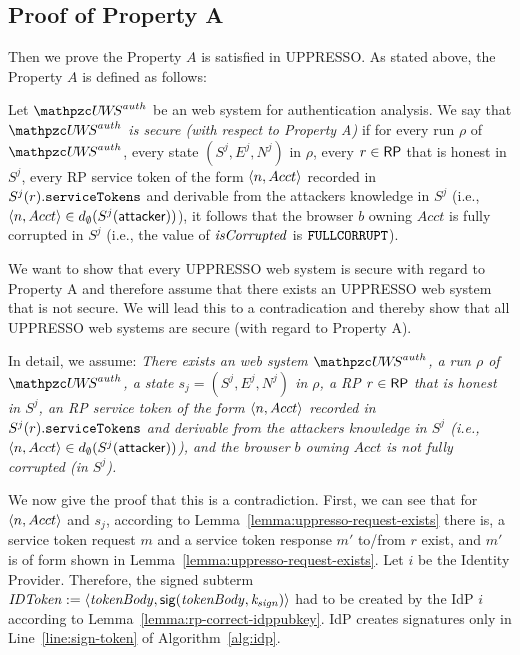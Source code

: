   \subsection{Proof of Property A}
  Then we prove the Property $A$ is satisfied in UPPRESSO.
  As stated above, the Property $A$ is defined as follows:
  \begin{definition}\label{def:uppresso-security-property} 
    Let $\uppressoauthwebsystem$ be an \uppresso web system 
    for authentication analysis. We say that 
    \emph{$\uppressoauthwebsystem$ is secure 
    (with respect to Property A)} if for every run $\rho$ of 
    $\uppressoauthwebsystem$, every state $(S^j, E^j, N^j)$ in 
    $\rho$, every $r\in \mathsf{RP}$ that is honest in $S^j$, 
    every RP service token of the form $\langle {{}n, Acct} \rangle$ 
    recorded in $S^j(r).\mathtt{serviceTokens}$ and derivable 
    from the attackers knowledge in $S^j$ (i.e., 
    $\langle {{}n, Acct} \rangle \in 
    d_{\emptyset}(S^j(\mathsf{attacker}))$), it follows that the 
    browser $b$ owning $Acct$ is fully corrupted in $S^j$ 
    (i.e., the value of $\mathit{isCorrupted}$ is $\mathtt{FULLCORRUPT}$). 
  \end{definition}
  

  
  We want to show that every UPPRESSO web system is secure with regard to Property A and therefore assume that there exists an UPPRESSO web system that is not secure. We will lead this to a contradication and thereby show that all UPPRESSO web systems are secure (with regard to Property A).

  
  In detail, we assume: \emph{There exists an \uppresso web 
  system $\uppressoauthwebsystem$, a run $\rho$ of 
  $\uppressoauthwebsystem$, a state $s_j = (S^j, E^j, N^j)$ 
  in $\rho$, a RP $r\in \mathsf{RP}$ that is honest in $S^j$, 
  an RP service token of the form $\langle {{}n, Acct} \rangle$
  recorded in $S^j(r).\mathtt{serviceTokens}$ and derivable from 
  the attackers knowledge in $S^j$ (i.e., $\langle {{}n, Acct} \rangle \in
  d_{\emptyset}(S^j(\mathsf{attacker}))$), and the browser $b$ 
  owning $Acct$ is not fully corrupted (in $S^j$).}
  
  We now give the proof that this is a contradiction. First, we can see that for $\langle n, Acct\rangle$ and $s_j$, according to Lemma~\ref{lemma:uppresso-request-exists} there is, a service token request $m$ and a service token response $m'$ to/from $r$ exist, and $m'$ is of form shown in Lemma~\ref{lemma:uppresso-request-exists}. Let $i$ be the Identity Provider. Therefore, the signed subterm $\mathit{IDToken} := \langle {{}\mathit{tokenBody}, \mathit{\mathsf{sig}(tokenBody, k_{sign})}} \rangle$ had to be created by the IdP $i$ according to Lemma~\ref{lemma:rp-correct-idppubkey}. IdP creates signatures only in Line~\ref{line:sign-token} of Algorithm~\ref{alg:idp}.
  
